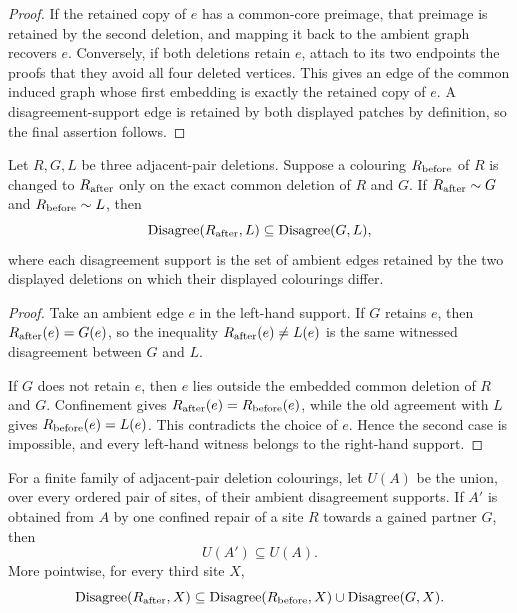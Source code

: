 \begin{proof}
If the retained copy of $e$ has a common-core preimage, that preimage is
retained by the second deletion, and mapping it back to the ambient graph
recovers $e$.  Conversely, if both deletions retain $e$, attach to its
two endpoints the proofs that they avoid all four deleted vertices.  This
gives an edge of the common induced graph whose first embedding is exactly
the retained copy of $e$.  A disagreement-support edge is retained by
both displayed patches by definition, so the final assertion follows.
\end{proof}

\begin{lemma}
\label{lem:confined-disagreement-support-transport}
Let $R,G,L$ be three adjacent-pair deletions.  Suppose a colouring
$R_{\rm before}$ of $R$ is changed to $R_{\rm after}$ only on the exact
common deletion of $R$ and $G$.  If
$R_{\rm after}\sim G$ and $R_{\rm before}\sim L$, then
\[
 \operatorname{Disagree}(R_{\rm after},L)
 \subseteq \operatorname{Disagree}(G,L),
\]
where each disagreement support is the set of ambient edges retained by the
two displayed deletions on which their displayed colourings differ.
\end{lemma}

\begin{proof}
Take an ambient edge $e$ in the left-hand support.  If $G$ retains $e$, then
$R_{\rm after}(e)=G(e)$, so the inequality
$R_{\rm after}(e)\ne L(e)$ is the same witnessed disagreement between $G$
and $L$.

If $G$ does not retain $e$, then $e$ lies outside the embedded common
deletion of $R$ and $G$.  Confinement gives
$R_{\rm after}(e)=R_{\rm before}(e)$, while the old agreement with $L$ gives
$R_{\rm before}(e)=L(e)$.  This contradicts the choice of $e$.  Hence the
second case is impossible, and every left-hand witness belongs to the
right-hand support.
\end{proof}

\begin{lemma}
\label{lem:confined-disagreement-union-antitone}
For a finite family of adjacent-pair deletion colourings, let $U(A)$ be the
union, over every ordered pair of sites, of their ambient disagreement
supports.  If $A'$ is obtained from $A$ by one confined repair of a site $R$
towards a gained partner $G$, then
\[
                         U(A')\subseteq U(A).
\]
More pointwise, for every third site $X$,
\[
 \operatorname{Disagree}(R_{\rm after},X)
 \subseteq
 \operatorname{Disagree}(R_{\rm before},X)
 \cup \operatorname{Disagree}(G,X).
\]
\end{lemma}

